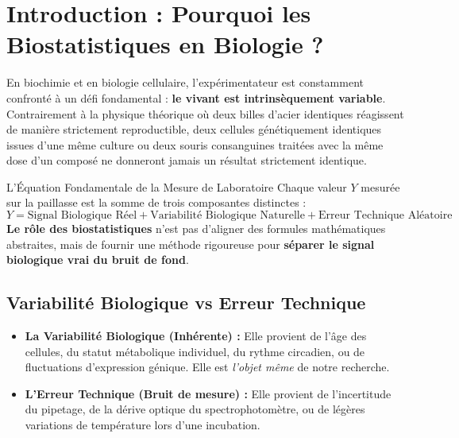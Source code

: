 \documentclass[11pt,a4paper]{article}
\begin{document}

\section{Introduction : Pourquoi les Biostatistiques en Biologie ?}

En biochimie et en biologie cellulaire, l'expérimentateur est constamment confronté à un défi fondamental : \textbf{le vivant est intrinsèquement variable}. Contrairement à la physique théorique où deux billes d'acier identiques réagissent de manière strictement reproductible, deux cellules génétiquement identiques issues d'une même culture ou deux souris consanguines traitées avec la même dose d'un composé ne donneront jamais un résultat strictement identique.

\begin{conceptbox}{L'Équation Fondamentale de la Mesure de Laboratoire}
Chaque valeur $Y$ mesurée sur la paillasse est la somme de trois composantes distinctes :
\begin{equation*}
Y = \text{Signal Biologique Réel} + \text{Variabilité Biologique Naturelle} + \text{Erreur Technique Aléatoire}
\end{equation*}
\textbf{Le rôle des biostatistiques} n'est pas d'aligner des formules mathématiques abstraites, mais de fournir une méthode rigoureuse pour \textbf{séparer le signal biologique vrai du bruit de fond}.
\end{conceptbox}

\subsection{Variabilité Biologique vs Erreur Technique}
\begin{itemize}[leftmargin=*, label=\faAngleRight]
  \item \textbf{La Variabilité Biologique (Inhérente) :} Elle provient de l'âge des cellules, du statut métabolique individuel, du rythme circadien, ou de fluctuations d'expression génique. Elle est \textit{l'objet même} de notre recherche.
  \item \textbf{L'Erreur Technique (Bruit de mesure) :} Elle provient de l'incertitude du pipetage, de la dérive optique du spectrophotomètre, ou de légères variations de température lors d'une incubation.
\end{itemize}
\end{document}
